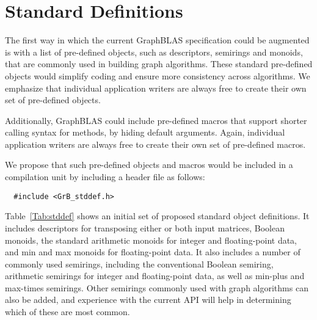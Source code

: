\section{Standard Definitions}
\label{Sec:stddef}

\newcommand{\integer}{{\sf int32\_t}}
\newcommand{\float}{{\sf float}}
\newcommand{\double}{{\sf double}}
\newcommand{\bool}{{\sf bool}}
\newcommand{\false}{{\sf false}}
\newcommand{\true}{{\sf true}}

The first way in which the current GraphBLAS specification could be augmented is 
with a list of 
pre-defined objects, such as descriptors, semirings and monoids, that are commonly used
in building graph algorithms. These standard pre-defined objects would
simplify coding and ensure more consistency across algorithms. 
We emphasize
that individual application writers are always free to create their own set of
pre-defined objects.

Additionally, GraphBLAS could include pre-defined macros that support
shorter calling syntax for methods, by hiding default arguments. 
Again, individual application writers are always free to create their
own set of pre-defined macros.

We propose that such pre-defined objects and macros would
be included in a compilation unit by including a header file as follows:

\begin{verbatim}
  #include <GrB_stddef.h>
\end{verbatim}

Table~\ref{Tab:stddef} shows an initial set of proposed standard object
definitions.  It includes descriptors for transposing either or both input
matrices, Boolean monoids, the standard arithmetic monoids for integer and 
floating-point data, and min and max monoids for floating-point data.  It 
also includes a number of commonly used semirings, including the conventional
Boolean semiring, arithmetic semirings for integer and floating-point data, as
well as min-plus and max-times semirings.  Other semirings commonly used
with graph algorithms can also be added, and experience with the current API will
help in determining which of these are most common.

